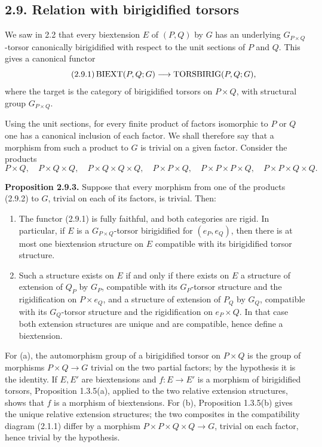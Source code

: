\documentclass[11pt]{article}
\begin{document}
\subsection*{2.9. Relation with birigidified torsors}
We saw in 2.2 that every biextension \(E\) of \((P,Q)\) by \(G\) has an underlying \(G_{P\times Q}\)-torsor canonically birigidified with respect to the unit sections of \(P\) and \(Q\).  This gives a canonical functor
\begin{equation}\tag{2.9.1}
  \operatorname{BIEXT}(P,Q;G)\longrightarrow\operatorname{TORSBIRIG}(P,Q;G),
\end{equation}
where the target is the category of birigidified torsors on \(P\times Q\), with structural group \(G_{P\times Q}\).

Using the unit sections, for every finite product of factors isomorphic to \(P\) or \(Q\) one has a canonical inclusion of each factor.  We shall therefore say that a morphism from such a product to \(G\) is trivial on a given factor.  Consider the products
\begin{equation}\tag{2.9.2}
  P\times Q,
  \quad P\times Q\times Q,
  \quad P\times Q\times Q\times Q,
  \quad P\times P\times Q,
  \quad P\times P\times P\times Q,
  \quad P\times P\times Q\times Q.
\end{equation}

\textbf{Proposition 2.9.3.}  Suppose that every morphism from one of the products (2.9.2) to \(G\), trivial on each of its factors, is trivial.  Then:
\begin{enumerate}[label=\alph*)]
\item The functor (2.9.1) is fully faithful, and both categories are rigid.  In particular, if \(E\) is a \(G_{P\times Q}\)-torsor birigidified for \((e_P,e_Q)\), then there is at most one biextension structure on \(E\) compatible with its birigidified torsor structure.
\item Such a structure exists on \(E\) if and only if there exists on \(E\) a structure of extension of \(Q_P\) by \(G_P\), compatible with its \(G_P\)-torsor structure and the rigidification on \(P\times e_Q\), and a structure of extension of \(P_Q\) by \(G_Q\), compatible with its \(G_Q\)-torsor structure and the rigidification on \(e_P\times Q\).  In that case both extension structures are unique and are compatible, hence define a biextension.
\end{enumerate}

For (a), the automorphism group of a birigidified torsor on \(P\times Q\) is the group of morphisms \(P\times Q\to G\) trivial on the two partial factors; by the hypothesis it is the identity.  If \(E,E'\) are biextensions and \(f:E\to E'\) is a morphism of birigidified torsors, Proposition 1.3.5(a), applied to the two relative extension structures, shows that \(f\) is a morphism of biextensions.  For (b), Proposition 1.3.5(b) gives the unique relative extension structures; the two composites in the compatibility diagram (2.1.1) differ by a morphism \(P\times P\times Q\times Q\to G\), trivial on each factor, hence trivial by the hypothesis.
\end{document}
